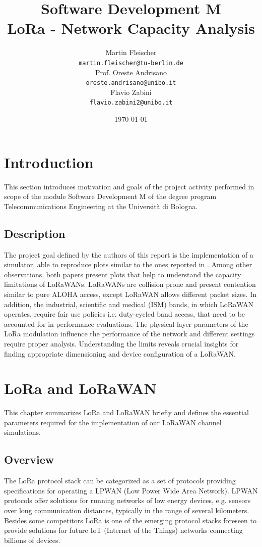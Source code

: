 \documentclass{article}
\title{Software Development M \\
LoRa - Network Capacity Analysis}
\author{
Martin Fleischer \\
\texttt{martin.fleischer@tu-berlin.de} \\
\small Prof. Oreste Andrisano \\
\small \texttt{oreste.andrisano@unibo.it} \\
\small Flavio Zabini \\
\small \texttt{flavio.zabini2@unibo.it}
}
\date{\today}
\begin{document}
\maketitle
\tableofcontents

\section{Introduction}
This section introduces motivation and goals of the project activity performed
in scope of the module Software Development M of the degree program
Telecommunications Engineering at the Universit\`{a} di Bologna.

\subsection{Description}
The project goal defined by the authors of this report is the implementation of
a simulator, able to reproduce plots similar to the ones reported in
\cite{augustin2016study, adelantado2017understanding}. Among other
observations, both papers present plots that help to understand the capacity
limitations of LoRaWANs. LoRaWANs are collision prone and present contention
similar to pure ALOHA access, except LoRaWAN allows different packet sizes. In
addition, the industrial, scientific and medical (ISM) bands, in which LoRaWAN
operates, require fair use policies i.e. duty-cycled band access, that need to
be accounted for in performance evaluations. The physical layer parameters of
the LoRa modulation influence the performance of the network and different
settings require proper analysis. Understanding the limits reveals crucial
insights for finding appropriate dimensioning and device configuration of a
LoRaWAN.

\section{LoRa and LoRaWAN}
This chapter summarizes LoRa and LoRaWAN briefly and defines the essential
parameters required for the implementation of our LoRaWAN channel simulations.

\subsection{Overview}
The LoRa protocol stack can be categorized as a set of protocols providing
specifications for operating a LPWAN (Low Power Wide Area Network). LPWAN
protocols offer solutions for running networks of low energy devices, e.g.
sensors over long communication distances, typically in the range of several
kilometers. Besides some competitors LoRa is one of the emerging protocol
stacks foreseen to provide solutions for future IoT (Internet of the Things)
networks connecting billions of devices.\\
\end{document}
